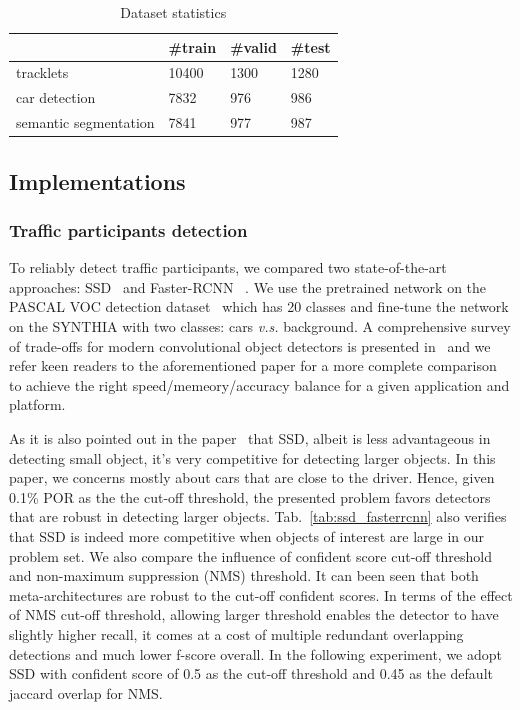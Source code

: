 \documentclass[10pt,twocolumn,letterpaper]{article}
\newcommand{\ra}[1]{\renewcommand{\arraystretch}{#1}}
\begin{document}
\begin{table}\centering
\ra{1.}
\begin{tabular}{@{}llll@{}}\toprule

                & \#train & \#valid & \#test\\
 \hline
 tracklets      &  10400    &  1300    & 1280 \\
 \hline
 car detection  &   7832     & 976     & 986 \\
 \hline
 semantic segmentation  &  7841  & 977  & 987 \\
 \hline
\end{tabular}
\caption{Dataset statistics}
\label{tab:dataset_statistics}
\end{table}
\subsection{Implementations}\label{sec:Implementations}


\subsubsection{Traffic participants detection}

To reliably detect traffic participants, we compared two state-of-the-art approaches: SSD~\cite{liu2016ssd} and Faster-RCNN ~\cite{ren2015faster_nips}.
We use the pretrained network on the PASCAL VOC detection dataset~\cite{everingham2015pascal} which has 20 classes and fine-tune the network on the SYNTHIA with two classes: cars \emph{v.s.} background.
A comprehensive survey of trade-offs for modern convolutional object detectors is presented in~\cite{huang2017speed} and we refer keen readers to the aforementioned paper for a more complete comparison to achieve the right speed/memeory/accuracy balance for a given application and platform.

As it is also pointed out in the paper~\cite{huang2017speed} that SSD, albeit is less advantageous in detecting small object, it's very competitive for detecting larger objects. In this paper, we concerns mostly about cars that are close to the driver. Hence, given 0.1\% POR as the the cut-off threshold, the presented problem favors detectors that are robust in detecting larger objects.
Tab.~\ref{tab:ssd_fasterrcnn} also verifies that SSD is indeed more competitive when objects of interest are large in our problem set. We also compare the influence of confident score cut-off threshold and non-maximum suppression (NMS) threshold. It can been seen that both meta-architectures are robust to the cut-off confident scores.
In terms of the effect of NMS cut-off threshold, allowing larger threshold enables the detector to have slightly higher recall, it comes at a cost of multiple redundant overlapping detections and much lower f-score overall. In the following experiment, we adopt SSD with confident score of 0.5 as the cut-off threshold and 0.45 as the default jaccard overlap for NMS.
\end{document}
